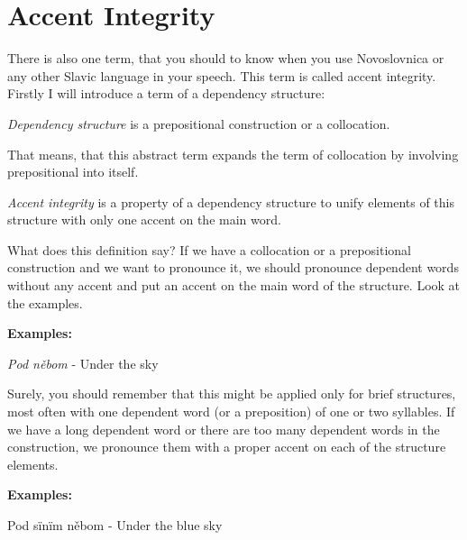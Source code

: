 \section{Accent Integrity}

There is also one term, that you should to know when you use Novoslovnica or any other Slavic language in your speech. This term is called accent integrity. Firstly I will introduce a term of a dependency structure:

\textit{Dependency structure} is a prepositional construction or a collocation.

That means, that this abstract term expands the term of collocation by involving prepositional into itself. 

\textit{Accent integrity} is a property of a dependency structure to unify elements of this structure with only one accent on the main word.

What does this definition say? If we have a collocation or a prepositional construction and we want to pronounce it, we should pronounce dependent words without any accent and put an accent on the main word of the structure. Look at the examples.

\textbf{Examples:}

\textit{Pod něbom} \textipa{[p@d 'nIbom ]} - Under the sky

Surely, you should remember that this might be applied only for brief structures, most often with one dependent word (or a preposition) of one or two syllables. If we have a long dependent word or there are too many dependent words in the construction, we pronounce them with a proper accent on each of the structure elements.

\textbf{Examples:}

Pod sïnïm něbom  - Under the blue sky
